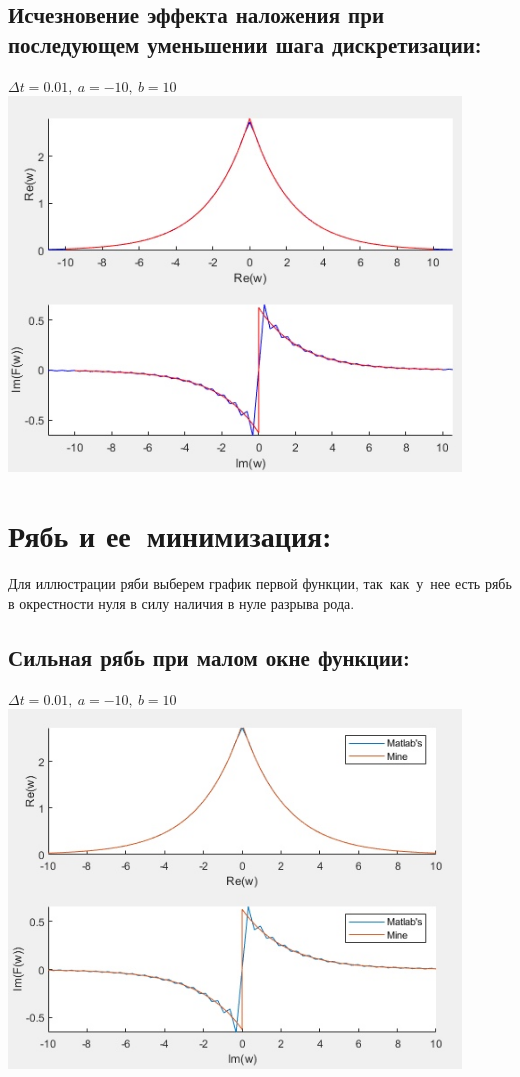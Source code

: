 \documentclass{article}
\newcommand{\RNumb}[1]{\uppercase\expandafter{\romannumeral #1\relax}}
\begin{document}
{\large\subsection{Исчезновение эффекта наложения при последующем уменьшении шага дискретизации:}}
\begin{center}
  $\Delta t = 0.01,\ a = -10,\ b = 10$
  \includegraphics[width = 12cm, height 12cm]{spectre2_3.jpg}
\end{center}

\newpage

{\Large\bfseries\section{Рябь и ее~минимизация:}}
\noindent Для иллюстрации ряби выберем график первой функции, так~как~у~нее есть рябь в окрестности нуля в силу наличия в нуле разрыва \RNumb2 рода.

{\large\subsection{Сильная рябь при малом окне функции:}}
\begin{center}
  $\Delta t = 0.01,\ a = -10,\ b = 10$
  \includegraphics[width = 12cm, height 12cm]{dribble_1.jpg}
\end{center}
\end{document}
